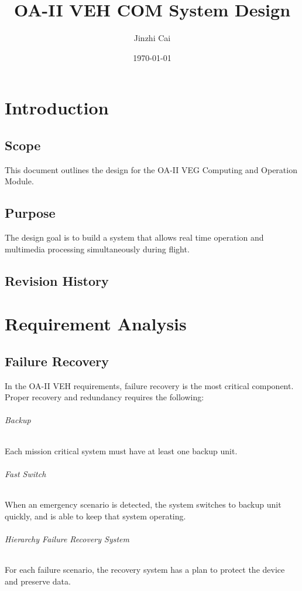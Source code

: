 \documentclass[12pt,article]{memoir}
\title{OA-II VEH COM System Design}
\author{Jinzhi Cai}
\date{\today}
\begin{document}
	


\tableofcontents*
\clearpage



\chapter{Introduction}
\section{Scope}
This document outlines the design for the OA-II VEG Computing and Operation Module.
\section{Purpose}
The design goal is to build a system that allows real time operation and multimedia processing simultaneously during flight.
\section{Revision History}
\begin{table}[H]
	\centering
	\caption{Summary of Revision History}
	\label{tab:rev}
\end{table}
\newpage
\chapter{Requirement Analysis}
\section{Failure Recovery}
In the OA-II VEH requirements, failure recovery is the most critical component. Proper recovery and redundancy requires the following:

\subparagraph{Backup}Each mission critical system must have at least one backup unit.
\subparagraph{Fast Switch} When an emergency scenario is detected, the system switches to backup unit quickly, and is able to keep that system operating.
\subparagraph{Hierarchy Failure Recovery System} For each failure scenario, the recovery system has a plan to protect the device and preserve data.
\end{document}
